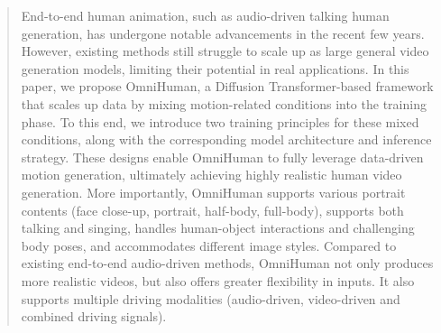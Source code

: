 \begin{abstract}
End-to-end human animation, such as audio-driven talking human generation, has undergone notable advancements in the recent few years. However, existing methods still struggle to scale up as large general video generation models, limiting their potential in real applications. In this paper, we propose OmniHuman, a Diffusion Transformer-based framework that scales up data by mixing motion-related conditions into the training phase. To this end, we introduce two training principles for these mixed conditions, along with the corresponding model architecture and inference strategy. These designs enable OmniHuman to fully leverage data-driven motion generation, ultimately achieving highly realistic human video generation. More importantly, OmniHuman supports various portrait contents (face close-up, portrait, half-body, full-body), supports both talking and singing, handles human-object interactions and challenging body poses, and accommodates different image styles. Compared to existing end-to-end audio-driven methods, OmniHuman not only produces more realistic videos, but also offers greater flexibility in inputs. It also supports multiple driving modalities (audio-driven, video-driven and combined driving signals). 
\end{abstract}
